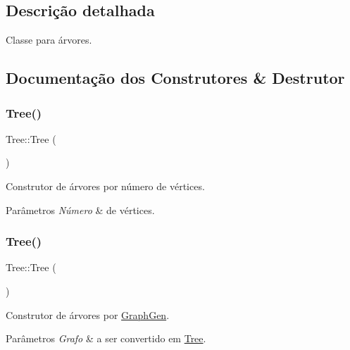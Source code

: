 \subsection{Descrição detalhada}
Classe para árvores. 

\subsection{Documentação dos Construtores \& Destrutor}
\mbox{\label{classTree_a25977c120f94e833fdd7739daa9b8d89}} 
\subsubsection{\texorpdfstring{Tree()}{Tree()}\hspace{0.1cm}{\footnotesize\ttfamily [1/2]}}
{\footnotesize\ttfamily Tree\+::\+Tree (\begin{DoxyParamCaption}\item[{int}]{ }\end{DoxyParamCaption})}

Construtor de árvores por número de vértices. 
\begin{DoxyParams}{Parâmetros}
{\em Número} & de vértices. \\
\hline
\end{DoxyParams}
\mbox{\label{classTree_a9f7d6a13c19b6525ee504079a5ffbd8e}} 
\subsubsection{\texorpdfstring{Tree()}{Tree()}\hspace{0.1cm}{\footnotesize\ttfamily [2/2]}}
{\footnotesize\ttfamily Tree\+::\+Tree (\begin{DoxyParamCaption}\item[{\mbox{\hyperlink{classGraphGen}{Graph\+Gen}} \&}]{ }\end{DoxyParamCaption})}

Construtor de árvores por \mbox{\hyperlink{classGraphGen}{Graph\+Gen}}. 
\begin{DoxyParams}{Parâmetros}
{\em Grafo} & a ser convertido em \mbox{\hyperlink{classTree}{Tree}}. \\
\hline
\end{DoxyParams}


